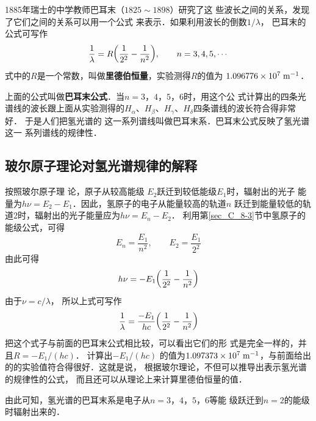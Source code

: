 1885年瑞士的中学教师巴耳末（$1825 \sim 1898$）研究了这
些波长之间的关系，发现了它们之间的关系可以用一个公式
来表示．如果利用波长的倒数$1/\lambda$，
巴耳末的公式可写作
\[\frac{1}{\lambda}=R\qty(\frac{1}{2^2}-\frac{1}{n^2}),\qquad n=3,4,5,\cdots\]
式中的$R$是一个常数，叫做\textbf{里德伯恒量}，实验测得$R$的值为
$1.096776\times10^7\;\text{m}^{-1}$．

上面的公式叫做\textbf{巴耳末公式}．当$n=3 $，$ 4 $，$ 5 $，$ 6$时，用这个公
式计算出的四条光谱线的波长跟上面从实验测得的$H_{\alpha}$、$H_{\beta}$、$H_{\gamma}$、$H_{\delta}$四条谱线的波长符合得非常好．
于是人们把氢光谱的
这一系列谱线叫做巴耳末系．巴耳末公式反映了氢光谱这一
系列谱线的规律性．

\subsection{玻尔原子理论对氢光谱规律的解释} 

按照玻尔原子理
论，原子从较高能级 $E_2$跃迁到较低能级$E_1$时，辐射出的光子
能量为$h\nu =E_2-E_1$．因此，氢原子的电子从能量较高的轨道$n$
跃迁到能量较低的轨道2时，辐射出的光子能量应为$h\nu=E_n-E_2$．
利用第\ref{sec_C_8-3}节中氢原子的能级公式，可得
\[E_n=\frac{E_1}{n^2},\qquad E_2=\frac{E_1}{2^2} \]
由此可得\[h\nu=-E_1\qty( \frac{1}{2^2}-\frac{1}{n^2} )\]
由于$\nu=c/\lambda$，
所以上式可写作
\[\frac{1}{\lambda}=\frac{-E_1}{hc}\qty( \frac{1}{2^2}-\frac{1}{n^2})\]
把这个式子与前面的巴耳末公式相比较，可以看出它们的形
式是完全一样的，并且$R=-E_1/(hc)$．
计算出$-E_1/(hc)$
的值为$1.097373\times10^7 \;\text{m}^{-1} $，与前面给出的的实验值符合得很好．这就是说，
根据玻尔理论，不但可以推导出表示氢光谱的规律性的公式，
而且还可以从理论上来计算里德伯恒量的值．

由此可知，氢光谱的巴耳末系是电子从$n=3 $，$ 4 $，$ 5 $，$ 6$等能
级跃迁到$n=2$的能级时辐射出来的．

